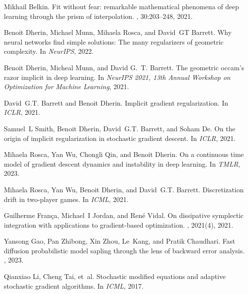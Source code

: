 \documentclass{article}
\begin{document}

\begin{thebibliography}{10}

Mikhail Belkin.
\newblock Fit without fear: remarkable mathematical phenomena of deep learning
  through the prism of interpolation.
, 30:203–248, 2021.

Benoit Dherin, Michael Munn, Mihaela Rosca, and David~GT Barrett.
\newblock Why neural networks find simple solutions: The many regularizers of
  geometric complexity.
\newblock In {\em NeurIPS}, 2022.

Benoit Dherin, Micheal Munn, and David G.~T. Barrett.
\newblock The geometric occam's razor implicit in deep learning.
\newblock In {\em NeurIPS 2021, 13th Annual Workshop on Optimization for
  Machine Learning}, 2021.

David~G.T. Barrett and Benoit Dherin.
\newblock Implicit gradient regularization.
\newblock In {\em ICLR}, 2021.

Samuel~L Smith, Benoit Dherin, David~G.T. Barrett, and Soham De.
\newblock On the origin of implicit regularization in stochastic gradient
  descent.
\newblock In {\em ICLR}, 2021.

Mihaela Rosca, Yan Wu, Chongli Qin, and Benoit Dherin.
\newblock On a continuous time model of gradient descent dynamics and
  instability in deep learning.
\newblock In {\em TMLR}, 2023.

Mihaela Rosca, Yan Wu, Benoit Dherin, and David~G.T. Barrett.
\newblock Discretization drift in two-player games.
\newblock In {\em ICML}, 2021.

Guilherme França, Michael~I Jordan, and René Vidal.
\newblock On dissipative symplectic integration with applications to
  gradient-based optimization.
,
  2021(4), 2021.

Yansong Gao, Pan Zhibong, Xin Zhou, Le~Kang, and Pratik Chaudhari.
\newblock Fast diffusion probabilistic model sapling through the lens of
  backward error analysis.
, 2023.

Qianxiao Li, Cheng Tai, et~al.
\newblock Stochastic modified equations and adaptive stochastic gradient
  algorithms.
\newblock In {\em ICML}, 2017.


\end{thebibliography}
\end{document}

